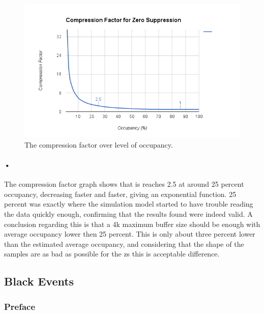 \documentclass[a4paper, 12pt]{report}
\begin{document}
\begin{figure}[h!]
	\centering
		\includegraphics[width=1.0\textwidth]{images/comp-factor-results.png}
		\caption{The compression factor over level of occupancy.}
		\label{fig:comp-factor-results}
\end{figure}

\paragraph{•}
The compression factor graph shows that is reaches 2.5 at around 25 percent occupancy, decreasing faster and faster, giving an exponential function.
25 percent was exactly where the simulation model started to have trouble reading the data quickly enough, confirming that the results found were indeed valid.
A conclusion regarding this is that a 4k maximum buffer size should be enough with average occupancy lower then 25 percent.
This is only about three percent lower than the estimated average occupancy, and considering that the shape of the samples are as bad as possible for the \gls{zs} this is acceptable difference.


\subsection{Black Events}

\subsubsection{Preface}
\end{document}
